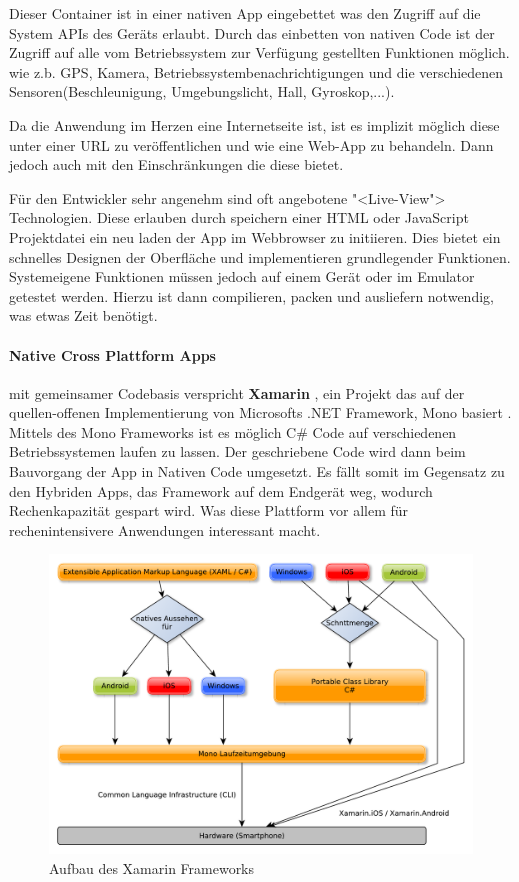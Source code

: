 Dieser Container ist in einer nativen App eingebettet was den Zugriff auf die System APIs des Geräts erlaubt. Durch das einbetten von nativen Code ist der Zugriff auf alle vom Betriebssystem zur Verfügung gestellten Funktionen möglich. wie z.b. GPS, Kamera, Betriebssystembenachrichtigungen und die verschiedenen Sensoren(Beschleunigung, Umgebungslicht, Hall, Gyroskop,...). 

Da die Anwendung im Herzen eine Internetseite ist, ist es implizit möglich diese unter einer URL zu veröffentlichen und wie eine Web-App zu behandeln. Dann jedoch auch mit den Einschränkungen die diese bietet.

Für den Entwickler sehr angenehm sind oft angebotene "<Live-View"> Technologien. Diese erlauben durch speichern einer HTML oder JavaScript Projektdatei ein neu laden der App im Webbrowser zu initiieren. Dies bietet ein schnelles Designen der Oberfläche und implementieren grundlegender Funktionen. Systemeigene Funktionen müssen jedoch auf einem Gerät oder im Emulator getestet werden. Hierzu ist dann compilieren, packen und ausliefern notwendig, was etwas Zeit benötigt.
\newpage
\paragraph{Native Cross Plattform Apps} mit gemeinsamer Codebasis verspricht \textbf{Xamarin} \cite{XAMA16}, ein Projekt das auf der quellen-offenen Implementierung von Microsofts .NET Framework, Mono basiert \cite{MONO16}. Mittels des Mono Frameworks ist es möglich C\# Code auf verschiedenen Betriebssystemen laufen zu lassen. Der geschriebene Code wird dann beim Bauvorgang der App in Nativen Code umgesetzt. Es fällt somit im Gegensatz zu den Hybriden Apps, das Framework auf dem Endgerät weg, wodurch Rechenkapazität gespart wird. Was diese Plattform vor allem für rechenintensivere Anwendungen interessant macht.

\begin{figure}[H]
	\centering
	\includegraphics[scale=0.58]{images/Xamarin}
	\caption[Aufbau des Xamarin Frameworks]{Aufbau des Xamarin Frameworks}
	\label{XamarinBild}
\end{figure}

